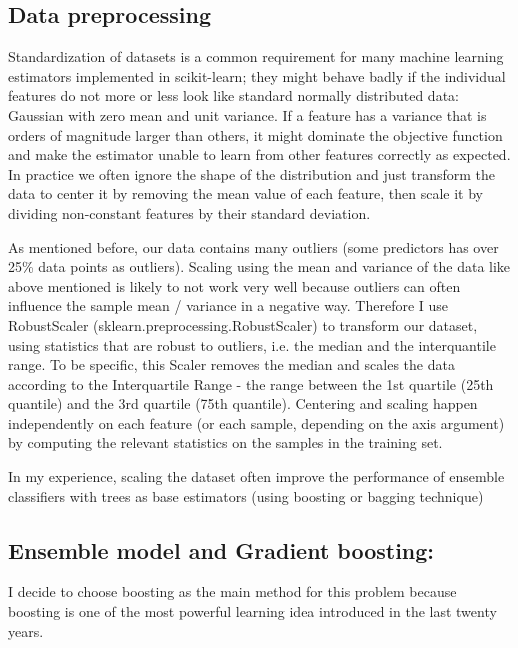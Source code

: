 \documentclass[journal,twocolumn,letterpaper]{IEEEJERM}
\begin{document}
\subsection{Data preprocessing}
Standardization of datasets is a common requirement for many machine learning estimators implemented in scikit-learn; they might behave badly if the individual features do not more or less look like standard normally distributed data: Gaussian with zero mean and unit variance. If a feature has a variance that is orders of magnitude larger than others, it might dominate the objective function and make the estimator unable to learn from other features correctly as expected.
In practice we often ignore the shape of the distribution and just transform the data to center it by removing the mean value of each feature, then scale it by dividing non-constant features by their standard deviation.

As mentioned before, our data contains many outliers (some predictors has over 25\% data points as outliers). Scaling using the mean and variance of the data like above mentioned is likely to not work very well because outliers can often influence the sample mean / variance in a negative way. Therefore I use RobustScaler (sklearn.preprocessing.RobustScaler) to transform our dataset, using statistics that are robust to outliers, i.e. the median and the interquantile range. 
To be specific, this Scaler removes the median and scales the data according to the Interquartile Range - the range between the 1st quartile (25th quantile) and the 3rd quartile (75th quantile). Centering and scaling happen independently on each feature (or each sample, depending on the axis argument) by computing the relevant statistics on the samples in the training set.


In my experience, scaling the dataset often improve the performance of ensemble classifiers with trees as base estimators (using boosting or bagging technique)

\subsection{Ensemble model and Gradient boosting:}

I decide to choose boosting as the main method for this problem because boosting is one of the most powerful learning idea introduced in the last twenty years. \cite[chap 10, p338]{elem2} 
\end{document}
